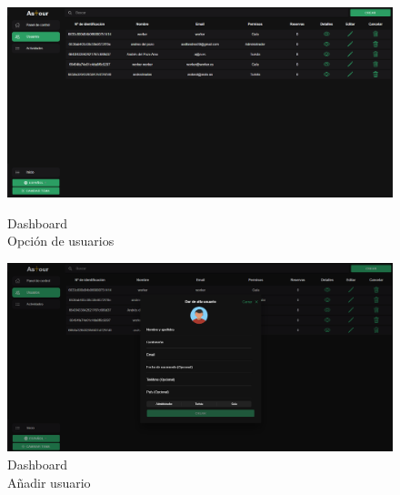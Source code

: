 \begin{figure}[H]
	\centering
	\begin{minipage}{0.45\textwidth}
		\centering
		\includegraphics[width=1\textwidth]{7-Construccion/Manuales/web/usuarios opcion.png}
		\caption{Dashboard \\ Opción de usuarios}
		\label{fig:usuarios-opcion}
	\end{minipage}
	\hfill
	\begin{minipage}{0.45\textwidth}
		\centering
		\includegraphics[width=1\textwidth]{7-Construccion/Manuales/web/usuario add.png}
		\caption{Dashboard \\ Añadir usuario}
		\label{fig:usuarios-add}
	\end{minipage}
\end{figure}

